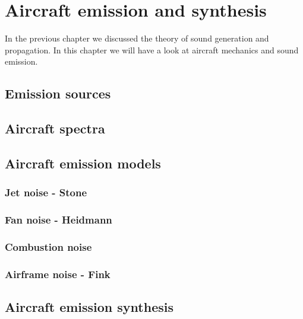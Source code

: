 \section{Aircraft emission and synthesis}

In the previous chapter we discussed the theory of sound generation and propagation. In this chapter we will have a look at aircraft mechanics and sound emission.

\subsection{Emission sources}

\subsection{Aircraft spectra}\label{sec:theory_aircraft_emission_aircraft_spectra}

\subsection{Aircraft emission models}\label{sec:theory_aircraft_emission_models}

\subsubsection{Jet noise - Stone}

\subsubsection{Fan noise - Heidmann}

\subsubsection{Combustion noise}

\subsubsection{Airframe noise - Fink}

\subsection{Aircraft emission synthesis}

